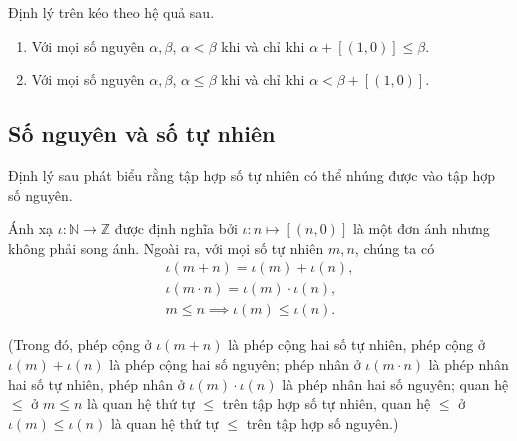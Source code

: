 Định lý trên kéo theo hệ quả sau.
\begin{corollary}
    \begin{enumerate}[label={(\roman*)}]
        \item Với mọi số nguyên $\alpha, \beta$, $\alpha < \beta$ khi và chỉ khi $\alpha + [(1, 0)]\leq \beta$.
        \item Với mọi số nguyên $\alpha, \beta$, $\alpha\leq \beta$ khi và chỉ khi $\alpha < \beta + [(1,0)]$.
    \end{enumerate}
\end{corollary}

\subsection{Số nguyên và số tự nhiên}

Định lý sau phát biểu rằng tập hợp số tự nhiên có thể nhúng được vào tập hợp số nguyên.
\begin{theorem}\label{theorem:embed-N-into-Z}
    Ánh xạ $\iota: \mathbb{N}\to \mathbb{Z}$ được định nghĩa bởi $\iota: n\mapsto [(n, 0)]$ là một đơn ánh nhưng không phải song ánh. Ngoài ra, với mọi số tự nhiên $m, n$, chúng ta có
    \[
        \begin{split}
            \iota(m + n) = \iota(m) + \iota(n), \\
            \iota(m\cdot n) = \iota(m)\cdot\iota(n), \\
            m\leq n \implies \iota(m)\leq \iota(n).
        \end{split}
    \]

    (Trong đó, phép cộng ở $\iota(m + n)$ là phép cộng hai số tự nhiên, phép cộng ở $\iota(m) + \iota(n)$ là phép cộng hai số nguyên; phép nhân ở $\iota(m\cdot n)$ là phép nhân hai số tự nhiên, phép nhân ở $\iota(m)\cdot\iota(n)$ là phép nhân hai số nguyên; quan hệ $\leq$ ở $m\leq n$ là quan hệ thứ tự $\leq$ trên tập hợp số tự nhiên, quan hệ $\leq$ ở $\iota(m)\leq \iota(n)$ là quan hệ thứ tự $\leq$ trên tập hợp số nguyên.)
\end{theorem}

